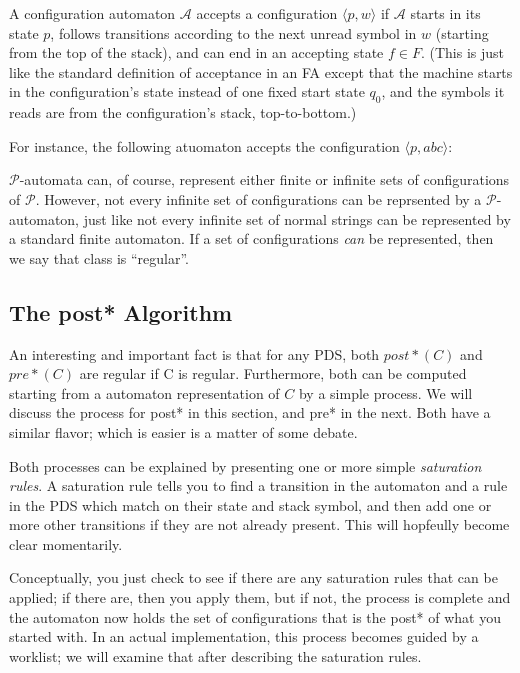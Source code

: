 \documentclass{article}
\newcommand{\Config}[2]{\ensuremath{\langle #1, #2 \rangle}}
\begin{document}
A configuration automaton $\mathcal{A}$ accepts a configuration
\Config{p}{w} if $\mathcal{A}$ starts in its state $p$, follows
transitions according to the next unread symbol in $w$ (starting from
the top of the stack), and can end in an accepting state $f \in
F$. (This is just like the standard definition of acceptance in an FA
except that the machine starts in the configuration's state instead of
one fixed start state $q_0$, and the symbols it reads are from the
configuration's stack, top-to-bottom.)

For instance, the following atuomaton accepts the configuration
\Config{p}{abc}:



$\mathcal{P}$-automata can, of course, represent either finite or
infinite sets of configurations of $\mathcal{P}$. However, not every
infinite set of configurations can be reprsented by a
$\mathcal{P}$-automaton, just like not every infinite set of normal
strings can be represented by a standard finite automaton. If a set of
configurations \emph{can} be represented, then we say that class is
``regular''.

\subsection{The post* Algorithm}

An interesting and important fact is that for any PDS, both $post*(C)$
and $pre*(C)$ are regular if C is regular. Furthermore, both can be
computed starting from a automaton representation of $C$ by a simple
process. We will discuss the process for post* in this section, and
pre* in the next. Both have a similar flavor; which is easier is a
matter of some debate.

Both processes can be explained by presenting one or more simple
\emph{saturation rules}. A saturation rule tells you to find a
transition in the automaton and a rule in the PDS which match on their
state and stack symbol, and then add one or more other transitions if
they are not already present. This will hopfeully become clear
momentarily. 

Conceptually, you just check to see if there are any saturation rules
that can be applied; if there are, then you apply them, but if not,
the process is complete and the automaton now holds the set of
configurations that is the post* of what you started with. In an
actual implementation, this process becomes guided by a worklist; we
will examine that after describing the saturation rules.
\end{document}
